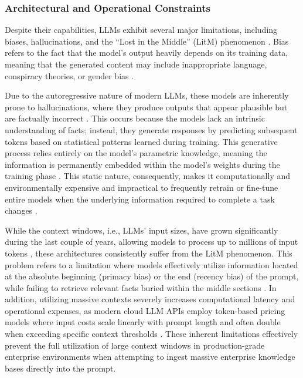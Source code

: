 \subsubsection{Architectural and Operational Constraints}

Despite their capabilities, LLMs exhibit several major limitations, including biases, hallucinations, and the ``Lost in the Middle'' (LitM) phenomenon \citep{introgenai, liu2024lost}. Bias refers to the fact that the model's output heavily depends on its training data, meaning that the generated content may include inappropriate language, conspiracy theories, or gender bias \citep{introgenai}. 

Due to the autoregressive nature of modern LLMs, these models are inherently prone to hallucinations, where they produce outputs that appear plausible but are factually incorrect \citep{ji2023survey}. This occurs because the models lack an intrinsic understanding of facts; instead, they generate responses by predicting subsequent tokens based on statistical patterns learned during training. This generative process relies entirely on the model's parametric knowledge, meaning the information is permanently embedded within the model's weights during the training phase \citep{bommasani2021opportunities}. This static nature, consequently, makes it computationally and environmentally expensive and impractical to frequently retrain or fine-tune entire models when the underlying information required to complete a task changes \citep{StanfordAIIndex2026}.

While the context windows, i.e., LLMs' input sizes, have grown significantly during the last couple of years, allowing models to process up to millions of input tokens \citep{geminiteam2024gemini, GoogleDeepMind2025Gemini3Flash}, these architectures consistently suffer from the LitM phenomenon. This problem refers to a limitation where models effectively utilize information located at the absolute beginning (primacy bias) or the end (recency bias) of the prompt, while failing to retrieve relevant facts buried within the middle sections \citep{liu2024lost}. In addition, utilizing massive contexts severely increases computational latency and operational expenses, as modern cloud LLM APIs employ token-based pricing models where input costs scale linearly with prompt length and often double when exceeding specific context thresholds \citep{GoogleVertexAIPricing}. These inherent limitations effectively prevent the full utilization of large context windows in production-grade enterprise environments when attempting to ingest massive enterprise knowledge bases directly into the prompt.

